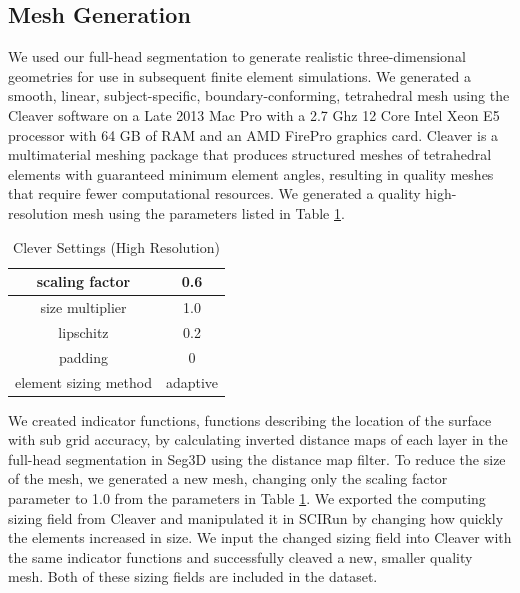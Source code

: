 \subsection{Mesh Generation}
\label{sec:mesh}


We used our full-head segmentation to generate realistic three-dimensional geometries for use in subsequent finite element simulations. We generated a smooth, linear, subject-specific, boundary-conforming, tetrahedral mesh using the Cleaver software \cite{ref:cleaver} on a Late 2013 Mac Pro with a 2.7 Ghz 12 Core Intel Xeon E5 processor with 64 GB of RAM and an AMD FirePro graphics card. Cleaver is a multimaterial meshing package that produces structured meshes of tetrahedral elements with guaranteed minimum element angles, resulting in quality meshes that require fewer computational resources. We generated a quality high-resolution mesh using the parameters listed in Table \ref{tab:cleaver}.

\begin{table}[H]
\centering
\caption{Clever Settings (High Resolution)}
\label{tab:cleaver}
\begin{tabular}{|c|c|}
\hline
scaling factor                    & 0.6                 \\ \hline
size multiplier                   & 1.0                 \\ \hline
lipschitz                         & 0.2                 \\ \hline
padding                           & 0                   \\ \hline
element sizing method             & adaptive            \\ \hline
\end{tabular}
\end{table}

We created indicator functions, functions describing the location of the surface with sub grid accuracy, by calculating inverted distance maps of each layer in the full-head segmentation in Seg3D using the distance map filter. To reduce the size of the mesh, we generated a new mesh, changing only the scaling factor parameter to 1.0 from the parameters in Table \ref{tab:cleaver}. We exported the computing sizing field from Cleaver and manipulated it in SCIRun by changing how quickly the elements increased in size. We input the changed sizing field into Cleaver with the same indicator functions and successfully cleaved a new, smaller quality mesh. Both of these sizing fields are included in the dataset.

